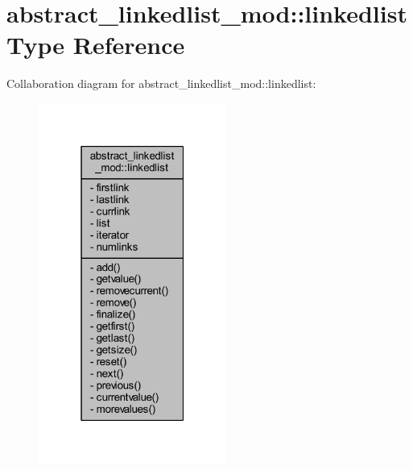 \hypertarget{structabstract__linkedlist__mod_1_1linkedlist}{}\section{abstract\+\_\+linkedlist\+\_\+mod\+:\+:linkedlist Type Reference}
\label{structabstract__linkedlist__mod_1_1linkedlist}


Collaboration diagram for abstract\+\_\+linkedlist\+\_\+mod\+:\+:linkedlist\+:\nopagebreak
\begin{figure}[H]
\begin{center}
\leavevmode
\includegraphics[width=175pt]{structabstract__linkedlist__mod_1_1linkedlist__coll__graph}
\end{center}
\end{figure}
